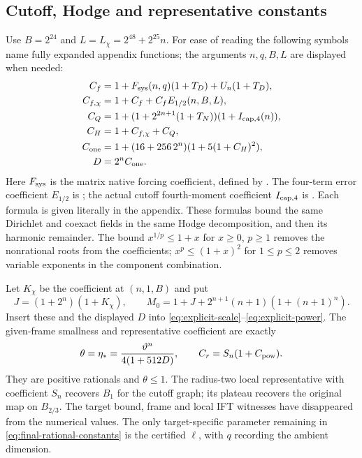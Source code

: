 \documentclass[reqno,11pt]{amsart}
\numberwithin{equation}{section}
\theoremstyle{definition}
\theoremstyle{remark}
\begin{document}
\subsection{Cutoff, Hodge and representative constants}
Use $B=2^{24}$ and $L=L_\chi=2^{48}+2^{25}n$.
For ease of reading the following symbols name fully expanded appendix
functions; the arguments $n,q,B,L$ are displayed when needed:
\begin{align*}
 C_f&=1+F_{\rm sys}(n,q)(1+T_D)+U_n(1+T_D),\\
 C_{f,\chi}&=1+C_f+C_fE_{1/2}(n,B,L),\\
 C_Q&=1+(1+2^{2n+1}(1+T_N))(1+I_{\rm cap,4}(n)),\\
 C_H&=1+C_{f,\chi}+C_Q,\\
 C_{\rm one}&=1+(16+256\,2^n)(1+5(1+C_H)^2),\\
 D&=2^n C_{\rm one}.
\end{align*}
Here $F_{\rm sys}$ is the matrix native forcing coefficient, defined by
. The four-term error coefficient
$E_{1/2}$ is ; the actual cutoff
fourth-moment coefficient $I_{\rm cap,4}$ is
. Each formula is given literally
in the appendix.
These formulas bound the same Dirichlet and coexact fields in the same
Hodge decomposition, and then its harmonic remainder. The bound
$x^{1/p}\leq1+x$ for $x\geq0$, $p\geq1$ removes the nonrational roots
from the coefficients; $x^p\leq(1+x)^2$ for $1\leq p\leq2$ removes
variable exponents in the component combination.

Let $K_\chi$ be the coefficient
 at $(n,1,B)$ and put
\[
 J=(1+2^n)(1+K_\chi),\qquad
 M_0=1+J+2^{n+1}(n+1)(1+(n+1)^n).
\]
Insert these and the displayed $D$ into
\eqref{eq:explicit-scale}--\eqref{eq:explicit-power}. The given-frame
smallness and representative coefficient are exactly
\begin{equation}\label{eq:theta-Cr-ledger}
 \theta=\eta_*=\frac{\vartheta^n}{4(1+512D)},\qquad
 C_r=S_n(1+C_{\rm pow}).
\end{equation}
They are positive rationals and $\theta\leq1$.
The radius-two local representative with coefficient $S_n$ recovers
$B_1$ for the cutoff graph; its plateau recovers the original map on
$B_{2/3}$. The target bound, frame and local IFT witnesses have disappeared
from the numerical values. The only target-specific parameter remaining
in \eqref{eq:final-rational-constants} is the certified $\ell$, with $q$
recording the ambient dimension.
\end{document}
